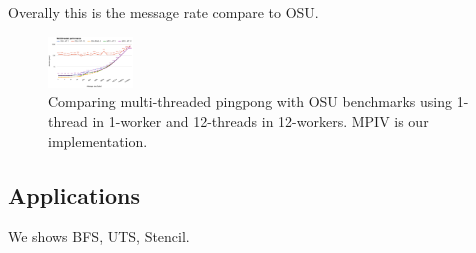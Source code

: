 Overally this is the message rate compare to OSU.
\begin{figure}[h!]
  \centering 
  \includegraphics[width=0.2\textwidth]{fig/pingpong.png}
  \caption{Comparing multi-threaded pingpong with OSU benchmarks using 1-thread
  in 1-worker and 12-threads in 12-workers. MPIV is our implementation.}
\end{figure}

\subsection{Applications}
We shows BFS, UTS, Stencil.

